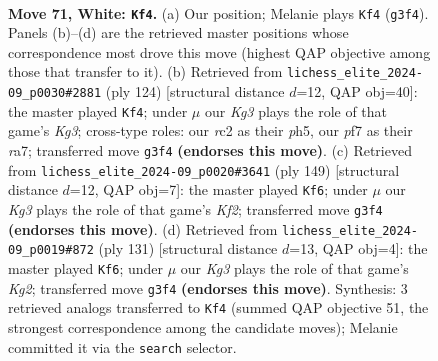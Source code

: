 \documentclass[11pt]{article}
\begin{document}
\clearpage

\begin{figure}[p]\centering
\begin{subfigure}{0.46\textwidth}\centering
\resizebox{\linewidth}{!}{%
\newchessgame
\chessboard[
  setfen={1R6/5p2/3Rp1k1/8/P3P3/5PK1/2r5/8 w - - 33 71},
  showmover=false,
  pgfstyle=straightmove, color=movearrow, markmove={g3-f4}
]}
\caption{}
\end{subfigure}\hfill
\begin{subfigure}{0.46\textwidth}\centering
\resizebox{\linewidth}{!}{%
\newchessgame
\chessboard[
  setfen={8/r7/8/5PPp/1k5P/p5K1/R7/8 w - - 1 63},
  showmover=false,
  pgfstyle=straightmove, color=movearrow, markmove={g3-f4}
]}
\caption{}
\end{subfigure}
\\[4pt]
\begin{subfigure}{0.46\textwidth}\centering
\resizebox{\linewidth}{!}{%
\newchessgame
\chessboard[
  setfen={3R4/5k2/6p1/7p/7P/r4P1K/6P1/8 b - - 47 75},
  showmover=false,
  pgfstyle=straightmove, color=movearrow, markmove={f7-f6}
]}
\caption{}
\end{subfigure}\hfill
\begin{subfigure}{0.46\textwidth}\centering
\resizebox{\linewidth}{!}{%
\newchessgame
\chessboard[
  setfen={2R5/6k1/6p1/7p/r6P/7K/6P1/8 b - - 9 66},
  showmover=false,
  pgfstyle=straightmove, color=movearrow, markmove={g7-f6}
]}
\caption{}
\end{subfigure}
\caption{\textbf{Move 71, White: \texttt{Kf4}.} (a) Our position; Melanie plays \texttt{Kf4} (\texttt{g3f4}). Panels (b)--(d) are the retrieved master positions whose correspondence most drove this move (highest QAP objective among those that transfer to it). (b) Retrieved from \texttt{lichess\_elite\_2024-09\_p0030\#2881} (ply 124) [structural distance $d$=12, QAP obj=40]: the master played \texttt{Kf4}; under $\mu$ our \emph{Kg3} plays the role of that game's \emph{Kg3}; cross-type roles: our \emph{r}c2 as their \emph{p}h5, our \emph{p}f7 as their \emph{r}a7; transferred move \texttt{g3f4} \textbf{(endorses this move)}. (c) Retrieved from \texttt{lichess\_elite\_2024-09\_p0020\#3641} (ply 149) [structural distance $d$=12, QAP obj=7]: the master played \texttt{Kf6}; under $\mu$ our \emph{Kg3} plays the role of that game's \emph{Kf2}; transferred move \texttt{g3f4} \textbf{(endorses this move)}. (d) Retrieved from \texttt{lichess\_elite\_2024-09\_p0019\#872} (ply 131) [structural distance $d$=13, QAP obj=4]: the master played \texttt{Kf6}; under $\mu$ our \emph{Kg3} plays the role of that game's \emph{Kg2}; transferred move \texttt{g3f4} \textbf{(endorses this move)}. Synthesis: 3 retrieved analogs transferred to \texttt{Kf4} (summed QAP objective 51, the strongest correspondence among the candidate moves); Melanie committed it via the \texttt{search} selector.}
\label{fig:thought-m140}
\end{figure}
\end{document}
